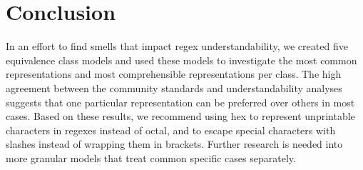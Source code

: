 \section{Conclusion}
\label{sec:conclusion}
In an effort to find smells that impact regex understandability, we created five equivalence class models and used these models to investigate the most common representations and most comprehensible representations per class. 
The high agreement between the community standards and understandability analyses suggests that one particular representation can be preferred over others in most cases. 
Based on these results, we recommend using hex to represent unprintable characters in regexes instead of octal, and to escape special characters with slashes instead of wrapping them in brackets. Further research is needed into more granular models that treat common specific cases separately.

